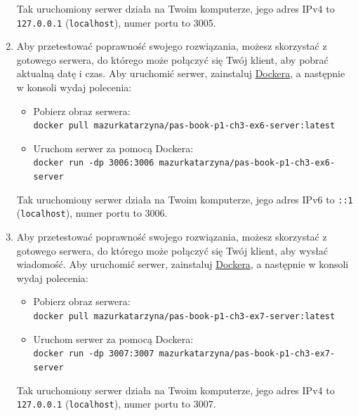 \begin{enumerate}[label=\textbf{3.\arabic*}]
\noindent Tak uruchomiony serwer działa na Twoim komputerze, jego adres IPv4 to \texttt{127.0.0.1} (\texttt{localhost}), numer portu to 3005.

\item Aby przetestować poprawność swojego rozwiązania, możesz skorzystać z gotowego serwera, do którego może połączyć się Twój klient, aby pobrać aktualną datę i czas. Aby uruchomić serwer, zainstaluj \href{https://www.docker.com/}{Dockera}, a następnie w konsoli wydaj polecenia:

\begin{itemize}
\item Pobierz obraz serwera:\\ \texttt{docker pull mazurkatarzyna/pas-book-p1-ch3-ex6-server:latest}

\item Uruchom serwer za pomocą Dockera:\\ \texttt{docker run -dp 3006:3006 mazurkatarzyna/pas-book-p1-ch3-ex6-server}
\end{itemize}

\noindent Tak uruchomiony serwer działa na Twoim komputerze, jego adres IPv6 to \texttt{::1} (\texttt{localhost}), numer portu to 3006.
\item Aby przetestować poprawność swojego rozwiązania, możesz skorzystać z gotowego serwera, do którego może połączyć się Twój klient, aby wysłać wiadomość. Aby uruchomić serwer, zainstaluj \href{https://www.docker.com/}{Dockera}, a następnie w konsoli wydaj polecenia:

\begin{itemize}
\item Pobierz obraz serwera:\\ \texttt{docker pull mazurkatarzyna/pas-book-p1-ch3-ex7-server:latest}

\item Uruchom serwer za pomocą Dockera:\\ \texttt{docker run -dp 3007:3007 mazurkatarzyna/pas-book-p1-ch3-ex7-server}
\end{itemize}

\noindent Tak uruchomiony serwer działa na Twoim komputerze, jego adres IPv4 to \texttt{127.0.0.1} (\texttt{localhost}), numer portu to 3007.

\end{enumerate}
